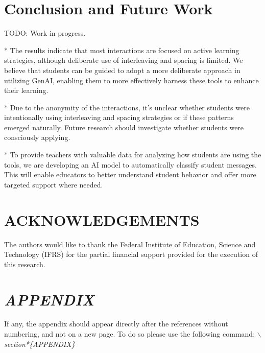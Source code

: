 \documentclass[a4paper,twoside]{article}
\begin{document}
\section{Conclusion and Future Work}

TODO: Work in progress.

* The results indicate that most interactions are focused on active learning
strategies, although deliberate use of interleaving and spacing is limited. We
believe that students can be guided \cite{Zheng19} \cite{Wang23} \cite{LiWei23}
\cite{Khusnul24} to adopt a more deliberate approach in utilizing GenAI,
enabling them to more effectively harness these tools to enhance their learning.

* Due to the anonymity of the interactions, it's unclear whether
students were intentionally using interleaving and spacing strategies or if
these patterns emerged naturally. Future research should investigate whether
students were consciously applying.

* To provide teachers with valuable data for analyzing how students are using
the tools, we are developing an AI model to automatically classify student
messages. This will enable educators to better understand student behavior and
offer more targeted support where needed.

\section*{ACKNOWLEDGEMENTS}

The authors would like to thank the Federal Institute of Education, Science and
Technology (IFRS) for the partial financial support provided for the execution
of this research.


{\small
}

\section*{\uppercase{\textit{Appendix}}}

If any, the appendix should appear directly after the
references without numbering, and not on a new page. To do so please use the
following command: \textit{$\backslash$section*\{APPENDIX\}}
\end{document}
